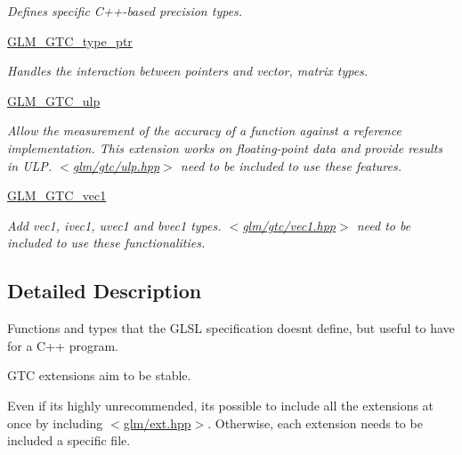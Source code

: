 \begin{DoxyCompactItemize}
\begin{DoxyCompactList}\small\item\em Defines specific C++-\/based precision types. \end{DoxyCompactList}\item 
\hyperlink{group__gtc__type__ptr}{G\+L\+M\+\_\+\+G\+T\+C\+\_\+type\+\_\+ptr}
\begin{DoxyCompactList}\small\item\em Handles the interaction between pointers and vector, matrix types. \end{DoxyCompactList}\item 
\hyperlink{group__gtc__ulp}{G\+L\+M\+\_\+\+G\+T\+C\+\_\+ulp}
\begin{DoxyCompactList}\small\item\em Allow the measurement of the accuracy of a function against a reference implementation. This extension works on floating-\/point data and provide results in U\+L\+P. $<$\hyperlink{ulp_8hpp}{glm/gtc/ulp.\+hpp}$>$ need to be included to use these features. \end{DoxyCompactList}\item 
\hyperlink{group__gtc__vec1}{G\+L\+M\+\_\+\+G\+T\+C\+\_\+vec1}
\begin{DoxyCompactList}\small\item\em Add vec1, ivec1, uvec1 and bvec1 types. $<$\hyperlink{vec1_8hpp}{glm/gtc/vec1.\+hpp}$>$ need to be included to use these functionalities. \end{DoxyCompactList}\end{DoxyCompactItemize}


\subsection{Detailed Description}
Functions and types that the G\+L\+S\+L specification doesn\textquotesingle{}t define, but useful to have for a C++ program. 

G\+T\+C extensions aim to be stable.

Even if it\textquotesingle{}s highly unrecommended, it\textquotesingle{}s possible to include all the extensions at once by including $<$\hyperlink{ext_8hpp}{glm/ext.\+hpp}$>$. Otherwise, each extension needs to be included a specific file. 